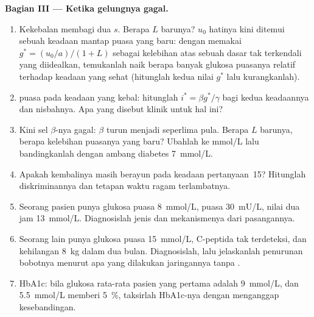 \begin{problem}
\medskip
\noindent\textbf{Bagian III --- Ketika gelungnya gagal.}
\begin{enumerate}[resume]
  \item Kekebalan  membagi dua $s$. Berapa $L$ barunya? $u_{0}$ hatinya kini
        ditemui sebuah keadaan mantap puasa yang baru: dengan memakai $g^{*} = (u_{0}/a)/(1
        + L)$ sebagai kelebihan atas sebuah dasar tak terkendali yang diidealkan, temukanlah
        naik berapa banyak glukosa puasanya relatif terhadap keadaan yang sehat
        (hitunglah kedua nilai $g^{*}$ lalu kurangkanlah).
  \item {} puasa pada keadaan yang kebal: hitunglah $i^{*} = \beta
        g^{*}/\gamma$ bagi kedua keadaannya dan nisbahnya. Apa yang disebut
        klinik untuk hal ini?
  \item Kini sel $\beta$-nya gagal: $\beta$ turun menjadi seperlima pula.
        Berapa $L$ barunya, berapa kelebihan puasanya yang baru? Ubahlah ke mmol/L lalu bandingkanlah dengan
        ambang diabetes \qty{7}{mmol/L}.
  \item Apakah kembalinya masih berayun pada keadaan pertanyaan~15?
        Hitunglah diskriminannya dan tetapan waktu ragam terlambatnya.
  \item Seorang pasien punya glukosa puasa \qty{8}{mmol/L},  puasa
        \qty{30}{mU/L}, nilai dua jam \qty{13}{mmol/L}. Diagnosislah jenis
        dan mekanismenya dari pasangannya.
  \item Seorang lain punya glukosa puasa \qty{15}{mmol/L}, C-peptida
        tak terdeteksi, dan kehilangan \qty{8}{kg} dalam dua bulan. Diagnosislah, lalu
        jelaskanlah penurunan bobotnya menurut apa yang dilakukan jaringannya tanpa
        .
  \item HbA1c: bila glukosa rata-rata pasien yang pertama adalah
        \qty{9}{mmol/L}, dan \qty{5.5}{mmol/L} memberi \qty{5}{\%}, taksirlah
        HbA1c-nya dengan menganggap kesebandingan.
\end{enumerate}


\end{problem}
